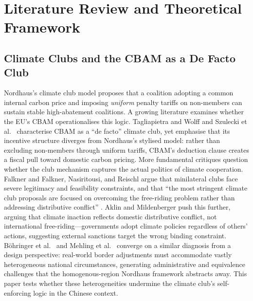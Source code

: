 \documentclass[letterpaper, 10pt, conference]{ieeeconf}
\begin{document}
\section{Literature Review and Theoretical Framework}
\label{sec:lit}

\subsection{Climate Clubs and the CBAM as a De Facto Club}
\label{sec:lit-clubs}

Nordhaus's \citeyearpar{Nordhaus2015} climate club model proposes that a coalition adopting a common internal carbon price and imposing \textit{uniform} penalty tariffs on non-members can sustain stable high-abatement coalitions. A growing literature examines whether the EU's CBAM operationalises this logic. Tagliapietra and Wolff \citeyearpar{Tagliapietra2021} and Szulecki et al.\ \citeyearpar{Szulecki2022} characterise CBAM as a ``de facto'' climate club, yet emphasise that its incentive structure diverges from Nordhaus's stylised model: rather than excluding non-members through uniform tariffs, CBAM's deduction clause creates a fiscal pull toward domestic carbon pricing. More fundamental critiques question whether the club mechanism captures the actual politics of climate cooperation. Falkner \citeyearpar{Falkner2016} and Falkner, Nasiritousi, and Reischl \citeyearpar{Falkner2022} argue that minilateral clubs face severe legitimacy and feasibility constraints, and that ``the most stringent climate club proposals are focused on overcoming the free-riding problem rather than addressing distributive conflict'' \citep{Falkner2022}. Aklin and Mildenberger \citeyearpar{Aklin2020} push this further, arguing that climate inaction reflects domestic distributive conflict, not international free-riding---governments adopt climate policies regardless of others' actions, suggesting external sanctions target the wrong binding constraint. Böhringer et al.\ \citeyearpar{Bohringer2022} and Mehling et al.\ \citeyearpar{Mehling2019} converge on a similar diagnosis from a design perspective: real-world border adjustments must accommodate vastly heterogeneous national circumstances, generating administrative and equivalence challenges that the homogenous-region Nordhaus framework abstracts away. This paper tests whether these heterogeneities undermine the climate club's self-enforcing logic in the Chinese context.
\end{document}
